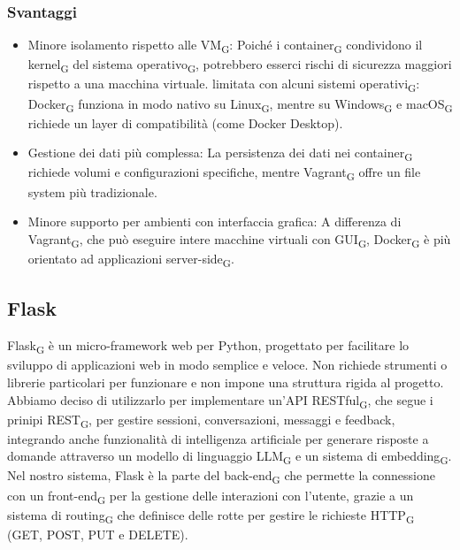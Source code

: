 \subsubsection{Svantaggi}
\begin{itemize}
    \item Minore isolamento rispetto alle VM\textsubscript{G}: Poiché i container\textsubscript{G} condividono il kernel\textsubscript{G} del sistema operativo\textsubscript{G}, potrebbero esserci rischi di sicurezza maggiori rispetto a una macchina virtuale.
     limitata con alcuni sistemi operativi\textsubscript{G}: Docker\textsubscript{G} funziona in modo nativo su Linux\textsubscript{G}, mentre su Windows\textsubscript{G} e macOS\textsubscript{G} richiede un layer di compatibilità (come Docker Desktop).
    \item Gestione dei dati più complessa: La persistenza dei dati nei container\textsubscript{G} richiede volumi e configurazioni specifiche, mentre Vagrant\textsubscript{G} offre un file system più tradizionale.
    \item Minore supporto per ambienti con interfaccia grafica: A differenza di Vagrant\textsubscript{G}, che può eseguire intere macchine virtuali con GUI\textsubscript{G}, Docker\textsubscript{G} è più orientato ad applicazioni server-side\textsubscript{G}.
\end{itemize}
\subsection{Flask}
Flask\textsubscript{G} è un micro-framework web per Python, progettato per facilitare lo sviluppo di applicazioni web in modo semplice e veloce. Non richiede strumenti o librerie particolari per funzionare e non impone una struttura rigida al progetto. Abbiamo deciso di utilizzarlo per implementare un'API RESTful\textsubscript{G}, che segue i prinipi REST\textsubscript{G}, per gestire sessioni, conversazioni, messaggi e feedback, integrando anche funzionalità di intelligenza artificiale per generare risposte a domande attraverso un modello di linguaggio LLM\textsubscript{G} e un sistema di embedding\textsubscript{G}. Nel nostro sistema, Flask è la parte del back-end\textsubscript{G} che permette la connessione con un front-end\textsubscript{G} per la gestione delle interazioni con l'utente, grazie a un sistema di routing\textsubscript{G} che definisce delle rotte per gestire le richieste HTTP\textsubscript{G} (GET, POST, PUT e DELETE). 

